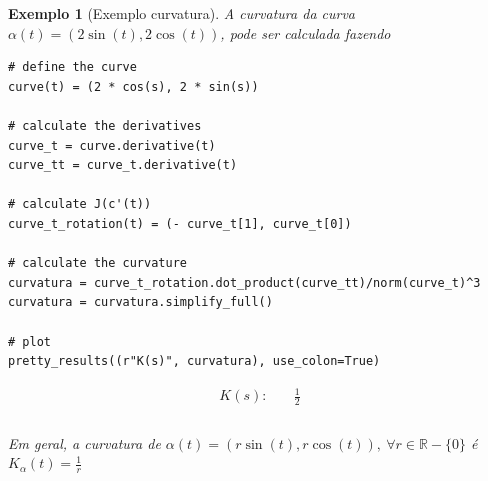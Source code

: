 \documentclass[12pt]{article}
\newtheorem{ex}{Exemplo}[section]
\begin{document}
\begin{ex}[Exemplo curvatura] A curvatura da curva $\alpha(t) = (2\sin(t), 2\cos(t))$, pode ser calculada fazendo
\begin{lstlisting}
# define the curve
curve(t) = (2 * cos(s), 2 * sin(s))

# calculate the derivatives
curve_t = curve.derivative(t)
curve_tt = curve_t.derivative(t)

# calculate J(c'(t))
curve_t_rotation(t) = (- curve_t[1], curve_t[0])

# calculate the curvature
curvatura = curve_t_rotation.dot_product(curve_tt)/norm(curve_t)^3
curvatura = curvatura.simplify_full()

# plot
pretty_results((r"K(s)", curvatura), use_colon=True)
\end{lstlisting}

\newcommand{\Bold}[1]{\mathbf{#1}}\begin{align*} K(s) :& \quad \frac{1}{2} \\ \end{align*} \\

Em geral, a curvatura de $\alpha(t) = (r \sin(t), r \cos(t)),\ \forall r \in \mathbb{R} - \{0\}$ é $K_\alpha(t) = \frac{1}{r}$
\end{ex}

%



\end{document}
